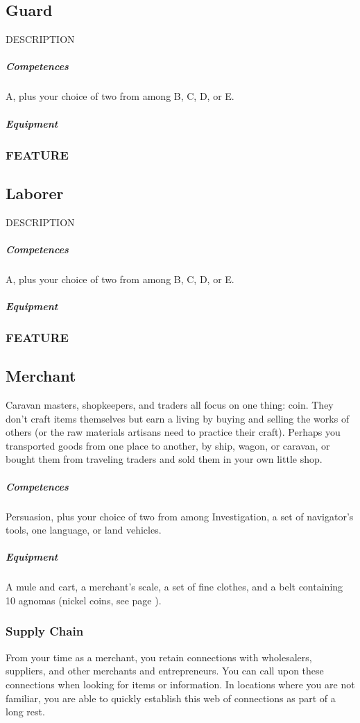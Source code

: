 \subsection*{Guard} \label{ssec::guard}
    DESCRIPTION
    \subparagraph{Competences} A, plus your choice of two from among B, C, D, or E.
    \subparagraph{Equipment}
    \subsubsection{FEATURE}

\subsection*{Laborer} \label{ssec::laborer}
    DESCRIPTION
    \subparagraph{Competences} A, plus your choice of two from among B, C, D, or E.
    \subparagraph{Equipment}
    \subsubsection{FEATURE}

\subsection*{Merchant} \label{ssec::merchant}
    Caravan masters, shopkeepers, and traders all focus on one thing: coin.
    They don't craft items themselves but earn a living by buying and selling the works of others (or the raw materials artisans need to practice their craft).
    Perhaps you transported goods from one place to another, by ship, wagon, or caravan, or bought them from traveling traders and sold them in your own little shop.
    \subparagraph{Competences} Persuasion, plus your choice of two from among Investigation, a set of navigator's tools, one language, or land vehicles.
    \subparagraph{Equipment} A mule and cart, a merchant's scale, a set of fine clothes, and a belt containing 10 agnomas (nickel coins, see page \pageref{sec::currency}).
    \subsubsection{Supply Chain} \label{feat::supplychain}
        From your time as a merchant, you retain connections with wholesalers, suppliers, and other merchants and entrepreneurs.
        You can call upon these connections when looking for items or information.
        In locations where you are not familiar, you are able to quickly establish this web of connections as part of a long rest.

